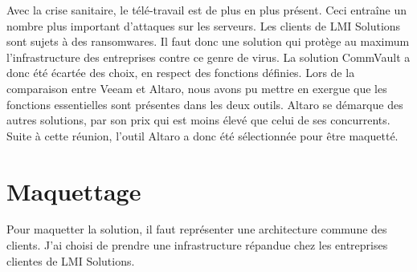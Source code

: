 \documentclass[pfe]{tnreport} %
\begin{document}
Avec la crise sanitaire, le télé-travail est de plus en plus présent. \newline
Ceci entraîne un nombre plus important d'attaques sur les serveurs. \newline
Les clients de LMI Solutions sont sujets à des ransomwares. Il faut donc une solution qui protège au maximum l'infrastructure des entreprises contre ce genre de virus. La solution CommVault a donc été écartée des choix, en respect des fonctions définies. \newline
Lors de la comparaison entre Veeam et Altaro, nous avons pu mettre en exergue que les fonctions essentielles sont présentes dans les deux outils. \newline
Altaro se démarque des autres solutions, par son prix qui est moins élevé que celui de ses concurrents. \newline
Suite à cette réunion, l'outil Altaro a donc été sélectionnée pour être maquetté. \newline
\newpage
\section{Maquettage}

Pour maquetter la solution, il faut représenter une architecture commune des clients. \newline
J'ai choisi de prendre une infrastructure répandue chez les entreprises clientes de LMI Solutions.
\end{document}
